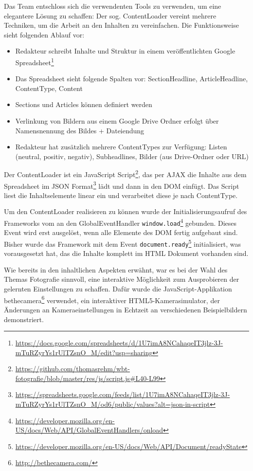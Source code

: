 \documentclass{article}
\begin{document}
Das Team entschloss sich die verwendenten Tools zu verwenden, um eine elegantere L\"osung zu schaffen: Der sog. ContentLoader vereint mehrere Techniken, um die Arbeit an den Inhalten zu vereinfachen. Die Funktionsweise sieht folgenden Ablauf vor:
\begin{itemize}
\item Redakteur schreibt Inhalte und Struktur in einem ver\"offentlichten Google Spreadsheet\footnote{\url{https://docs.google.com/spreadsheets/d/1U7imA8NCahaqeIT3jlz-3J-mTuRZyrYs1rUlTZsnO_M/edit?usp=sharing}}
\item Das Spreadsheet sieht folgende Spalten vor:
SectionHeadline, ArticleHeadline, ContentType, Content
\item Sections und Articles k\"onnen definiert werden
\item Verlinkung von Bildern aus einem Google Drive Ordner erfolgt \"uber Namensnennung des Bildes + Dateiendung
\item Redakteur hat zus\"atzlich mehrere ContentTypes zur Verf\"ugung: Listen (neutral, positiv, negativ), Subheadlines, Bilder (aus Drive-Ordner oder URL)

\end{itemize}

Der ContentLoader ist ein JavaScript Script\footnote{\url{https://github.com/thomasrehm/wbt-fotografie/blob/master/res/js/script.js\#L40-L99}}, das per AJAX die Inhalte aus dem Spreadsheet im JSON Format\footnote{\url{https://spreadsheets.google.com/feeds/list/1U7imA8NCahaqeIT3jlz-3J-mTuRZyrYs1rUlTZsnO_M/od6/public/values?alt=json-in-script}} l\"adt und dann in den DOM einf\"ugt. Das Script liest die Inhaltselemente linear ein und verarbeitet diese je nach ContentType.


Um den ContentLoader realisieren zu k\"onnen wurde der Initialisierungsaufruf des Frameworks vom an den GlobalEventHandler \texttt{window.load}\footnote{\url{https://developer.mozilla.org/en-US/docs/Web/API/GlobalEventHandlers/onload}} gebunden. Dieses Event wird erst ausgel\"ost, wenn alle Elemente des DOM fertig aufgebaut sind. Bisher wurde das Framework mit dem Event \texttt{document.ready}\footnote{\url{https://developer.mozilla.org/en-US/docs/Web/API/Document/readyState}} initialisiert, was vorausgesetzt hat, das die Inhalte komplett im HTML Dokument vorhanden sind.

Wie bereits in den inhaltlichen Aspekten erw\"ahnt, war es bei der Wahl des Themas Fotografie sinnvoll, eine interaktive M\"oglichkeit zum Ausprobieren der gelernten Einstellungen zu schaffen. Daf\"ur wurde die JavaScript-Applikation bethecamera\footnote{\url{http://bethecamera.com/}} verwendet, ein interaktiver HTML5-Kamerasimulator, der \"Anderungen an Kameraeinstellungen in Echtzeit an verschiedenen Beispielbildern demonstriert.
\end{document}
